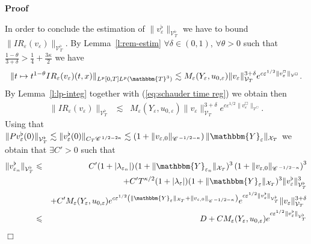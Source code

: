 \documentclass[a4paper,11pt]{article}
\newenvironment{proof}{\noindent\textbf{Proof\ }}{\hspace*{\fill}$\Box$\medskip}
\newcommand{\CC}{\mathscr{C} \hspace{.1em}}
\begin{document}
\begin{proof}
  
  In order to conclude the estimation of $\| v^{\flat}_{\varepsilon}
  \|_{\mathcal{V}^{\flat}_T}$ we have to bound $\| I R_{\varepsilon}
  (v_{\varepsilon}) \|_{\mathcal{V}^{\flat}_T}$. By Lemma~\ref{l:rem-estim}
  $\forall \delta \in (0, 1)$, $\forall \theta > 0$ such that $\frac{1 -
  \theta}{3 + \delta} > \frac{1}{4} + \frac{3 \kappa}{2}$ we have $$\|t \mapsto
  t^{1 - \theta} I R_{\varepsilon} (v_{\varepsilon}) (t, x) \|_{L^p [0, T] L^p
  (\mathbbm{T}^3)} \lesssim M_{\varepsilon} (Y_{\varepsilon}, u_{0,
  \varepsilon}) \| v_{\varepsilon} \|^{3 + \delta}_{\mathcal{V}_T} e^{c
  \varepsilon^{1 / 2} \|v^{\Box}_{\varepsilon} \|_{\mathcal{V}^{\Box}}}.$$ By
  Lemma~\ref{l:lp-integ} together with (\ref{eq:schauder time reg}) we obtain
  then
  \begin{eqnarray*}
    \| I R_{\varepsilon} (v_{\varepsilon}) \|_{\mathcal{V}^{\flat}_T} &
    \lesssim & M_{\varepsilon} (Y_{\varepsilon}, u_{0, \varepsilon}) \|
    v_{\varepsilon} \|^{3 + \delta}_{\mathcal{V}_T} e^{c \varepsilon^{1 / 2}
    \|v^{\Box}_{\varepsilon} \|_{\mathcal{V}^{\Box}}} .
  \end{eqnarray*}
  Using that $\| P v^{\flat}_{\varepsilon} (0) \|_{\mathcal{V}_T^{\flat}}
  \lesssim \| v^{\flat}_{\varepsilon} (0) \|_{C_T \CC^{1 / 2 - 2 \kappa}}
  \lesssim \left( 1 + \| v_{\varepsilon, 0} \|_{\CC^{- 1 / 2 - \kappa}}
  \right) \| \mathbbm{Y}_{\varepsilon} \|_{\mathcal{X}_T}$ we obtain that
  $\exists C' > 0$ such that
  \begin{eqnarray*}
    \| v^{\flat}_{\varepsilon_n} \|_{\mathcal{V}_T^{\flat}} & \leqslant & C'
    (1 + | \lambda_{\varepsilon_n} |)_{}  (1 + \| \mathbbm{Y}_{\varepsilon_n}
    \|_{\mathcal{X}_T})^3 \left( 1 + \| v_{\varepsilon, 0} \|_{\CC^{- 1 / 2 -
    \kappa}} \right)^3
    \\
    &  & + C' T^{\kappa / 2} (1 + | \lambda_{\varepsilon} |) (1
    + \| \mathbbm{Y}_{\varepsilon} \|_{\mathcal{X}_T})^3 \|
    v^{\flat}_{\varepsilon} \|_{\mathcal{V}^{\flat}_T}^3\\
    &  & + C' M_{\varepsilon} (Y_{\varepsilon}, u_{0, \varepsilon}) e^{c
    \varepsilon^{1 / 2} \left( \| \mathbbm{Y}_{\varepsilon} \|_{\mathcal{X}_T}
    + \| v_{\varepsilon, 0} \|_{\CC^{- 1 / 2 - \kappa}} \right)} e^{c
    \varepsilon^{1 / 2} \| v^{\flat}_{\varepsilon} \|_{\mathcal{V}_T^{\flat}}}
    \| v_{\varepsilon} \|^{3 + \delta}_{\mathcal{V}_T}\\
    & \leqslant & D + CM_{\varepsilon} (Y_{\varepsilon}, u_{0, \varepsilon})
    e^{c \varepsilon^{1 / 2} \| v^{\flat}_{\varepsilon}
    \|_{\mathcal{V}_T^{\flat}}}\\

\end{eqnarray*}
\end{proof}
\end{document}
